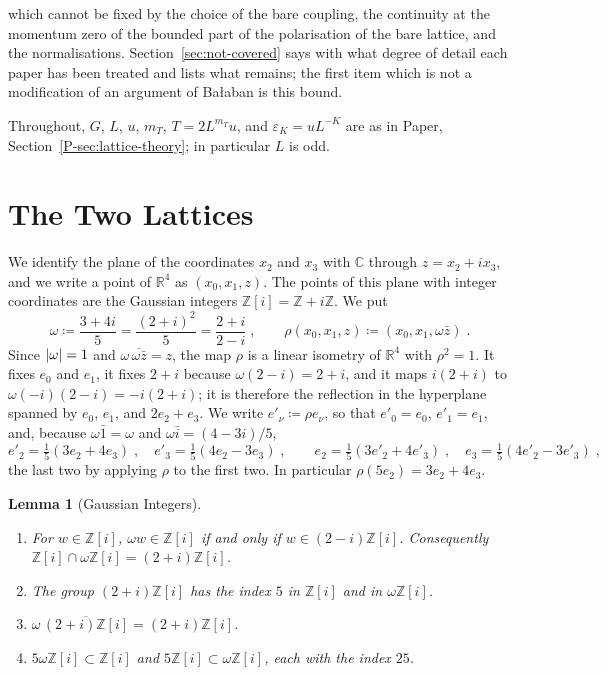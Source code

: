 \documentclass[11pt]{preprint}
\DeclarePairedDelimiter{\abs}{\lvert}{\rvert}
\numberwithin{equation}{section}
\newtheorem{lemma}[theorem]{Lemma}
\theoremstyle{definition}
\theoremstyle{remark}
\theoremstyle{plain}
\begin{document}
which cannot be fixed by the choice of the bare coupling, the continuity at the momentum zero of the bounded part of the polarisation of the bare lattice, and the normalisations. Section~\ref{sec:not-covered} says with what degree of detail each paper has been treated and lists what remains; the first item which is not a modification of an argument of Ba{\l}aban is this bound.

Throughout, $G$, $L$, $u$, $m_T$, $T = 2L^{m_T}u$, and $\varepsilon_K = uL^{-K}$ are as in Paper, Section~\ref{P-sec:lattice-theory}; in particular $L$ is odd.

\section{The Two Lattices}\label{sec:two-lattices}

We identify the plane of the coordinates $x_2$ and $x_3$ with $\mathbb C$ through $z = x_2 + ix_3$, and we write a point of $\mathbb R^4$ as $(x_0, x_1, z)$. The points of this plane with integer coordinates are the Gaussian integers $\mathbb Z[i] = \mathbb Z + i\mathbb Z$. We put
\begin{equation}\label{eq:omega}
    \omega \coloneqq \frac{3 + 4i}{5} = \frac{(2 + i)^2}{5} = \frac{2 + i}{2 - i}\;,
    \qquad
    \rho(x_0, x_1, z) \coloneqq (x_0, x_1, \omega\bar z)\;.
\end{equation}
Since $\abs{\omega} = 1$ and $\omega\,\overline{\omega\bar z} = z$, the map $\rho$ is a linear isometry of $\mathbb R^4$ with $\rho^2 = 1$. It fixes $e_0$ and $e_1$, it fixes $2 + i$ because $\omega(2 - i) = 2 + i$, and it maps $i(2 + i)$ to $\omega(-i)(2 - i) = -i(2 + i)$; it is therefore the reflection in the hyperplane spanned by $e_0$, $e_1$, and $2e_2 + e_3$. We write $e'_\nu \coloneqq \rho e_\nu$, so that $e'_0 = e_0$, $e'_1 = e_1$, and, because $\omega\bar 1 = \omega$ and $\omega\bar i = (4 - 3i)/5$,
\begin{equation}\label{eq:rho-vectors}
    e'_2 = \tfrac15(3e_2 + 4e_3)\;,
    \quad
    e'_3 = \tfrac15(4e_2 - 3e_3)\;,
    \qquad
    e_2 = \tfrac15(3e'_2 + 4e'_3)\;,
    \quad
    e_3 = \tfrac15(4e'_2 - 3e'_3)\;,
\end{equation}
the last two by applying $\rho$ to the first two. In particular $\rho(5e_2) = 3e_2 + 4e_3$.

\begin{lemma}[Gaussian Integers]\label{lem:gaussian}
\begin{enumerate}[label=(\roman*)]
\item For $w \in \mathbb Z[i]$, $\omega w \in \mathbb Z[i]$ if and only if $w \in (2 - i)\mathbb Z[i]$. Consequently $\mathbb Z[i] \cap \omega\mathbb Z[i] = (2 + i)\mathbb Z[i]$.
\item The group $(2 + i)\mathbb Z[i]$ has the index $5$ in $\mathbb Z[i]$ and in $\omega\mathbb Z[i]$.
\item $\omega\,\overline{(2 + i)\mathbb Z[i]} = (2 + i)\mathbb Z[i]$.
\item $5\omega\mathbb Z[i] \subset \mathbb Z[i]$ and $5\mathbb Z[i] \subset \omega\mathbb Z[i]$, each with the index $25$.
\end{enumerate}
\end{lemma}
\end{document}
